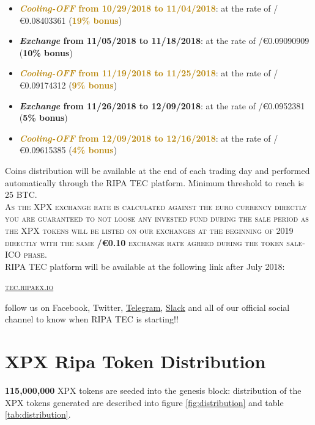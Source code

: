 \documentclass[11pt,fleqn]{book} %
\begin{document}
\begin{itemize}
	\item \textcolor{darkgoldenrod}{\textbf{\textit{Cooling-OFF} from 10/29/2018 to 11/04/2018}}: 
	at the rate of \PHP/\euro0.08403361 (\textcolor{darkgoldenrod}{\textbf{19\% bonus}})
	\item \textcolor{airforceblue}{\textbf{\textit{Exchange} from 11/05/2018 to 11/18/2018}}: at the rate of \PHP/\euro0.09090909 (\textcolor{airforceblue}{\textbf{10\% bonus}})
	\item \textcolor{darkgoldenrod}{\textbf{\textit{Cooling-OFF} from 11/19/2018 to 11/25/2018}}: 
	at the rate of \PHP/\euro0.09174312 (\textcolor{darkgoldenrod}{\textbf{9\% bonus}})
	\item \textcolor{airforceblue}{\textbf{\textit{Exchange} from 11/26/2018 to 12/09/2018}}: at the rate of \PHP/\euro0.0952381 (\textcolor{airforceblue}{\textbf{5\% bonus}})
	\item \textcolor{darkgoldenrod}{\textbf{\textit{Cooling-OFF} from 12/09/2018 to 12/16/2018}}: 
	at the rate of \PHP/\euro0.09615385 (\textcolor{darkgoldenrod}{\textbf{4\% bonus}})
\end{itemize}
\vspace{5mm}
Coins distribution will be available at the end of each trading day and performed automatically through the RIPA TEC platform. Minimum
threshold to reach is 25 BTC.\\

\textsc{As the XPX exchange rate is calculated against the euro currency directly you are guaranteed to not loose any invested fund
during the sale period as the XPX tokens will be listed on our exchanges at the beginning of 2019 directly with the same \textbf{\PHP/\euro0.10}
exchange rate agreed during the token sale-ICO phase}.\\

RIPA TEC platform will be available at the following link after July 2018:
\begin{center}
	\href{https://tec.ripaex.io}{\textsc{tec.ripaex.io}}
\end{center}
follow us on Facebook, Twitter, 
\href{https://t.me/ripaex}{Telegram}, 
\href{https://join.slack.com/t/ripaex/shared_invite/enQtMzM4NzUwNjU4OTQ0LTY3MDJmMTdhYTNlZjJlNGUxNzM1YjUwYjgyYjZlMDJmOTg3NTIzNThmNTYyMGQ3ODBkOTRmYzk3Y2Y4MzBkOTY}{Slack}
and all of our official social channel to know when RIPA TEC is starting!!

\section{XPX Ripa Token Distribution}
\textbf{115,000,000} XPX tokens are seeded into the genesis block: distribution of the XPX tokens generated are described into
figure \ref{fig:distribution} and table \ref{tab:distribution}.
\end{document}
